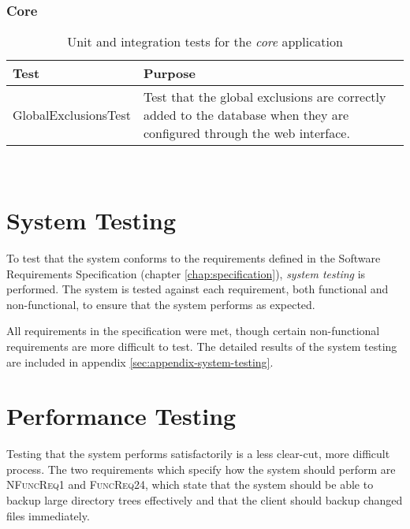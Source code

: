 \subsubsection{Core}

\begin{table}[H]
    \centering
    \begin{tabular}{ l  p{7cm} }
        \toprule
        Test                        & Purpose
        \\ \midrule
        GlobalExclusionsTest        & Test that the global exclusions are
                                      correctly added to the database when
                                      they are configured through the web
                                      interface.
        \\ \bottomrule
    \end{tabular}
    \caption{Unit and integration tests for the \emph{core} application}
    \label{tab:tests-core}
\end{table}

\ \\[0.5cm]

\section{System Testing}

To test that the system conforms to the requirements defined in the Software
Requirements Specification (chapter \ref{chap:specification}), \emph{system
testing} is performed. The system is tested against each requirement, both
functional and non-functional, to ensure that the system performs as expected.

All requirements in the specification were met, though certain non-functional
requirements are more difficult to test. The detailed results of the system
testing are included in appendix \ref{sec:appendix-system-testing}.

\section{Performance Testing}

Testing that the system performs satisfactorily is a less clear-cut, more
difficult process. The two requirements which specify how the system should
perform are \textsc{NFuncReq1} and \textsc{FuncReq24}, which state that the
system should be able to backup large directory trees effectively and that the
client should backup changed files immediately.

